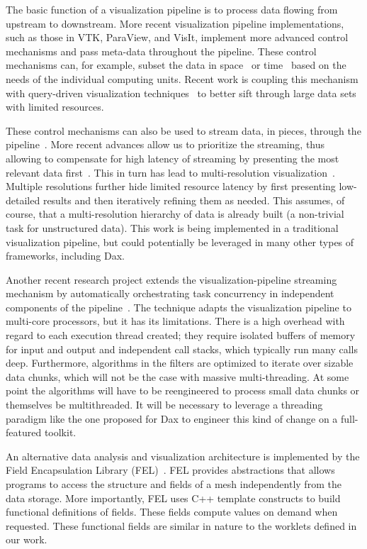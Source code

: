 \documentclass{vgtc}                          %
\newcommand*{\lcite}[1]{~\cite{#1}}
\begin{document}
The basic function of a visualization pipeline is to process data flowing
from upstream to downstream.  More recent visualization pipeline
implementations, such as those in VTK, ParaView, and VisIt, implement more
advanced control mechanisms and pass meta-data throughout the pipeline.
These control mechanisms can, for example, subset the data in
space\lcite{Childs05} or time\lcite{Biddiscombe07} based on the needs of
the individual computing units.  Recent work is coupling this mechanism
with query-driven visualization techniques\lcite{Gosink08} to better sift
through large data sets with limited resources.

These control mechanisms can also be used to stream data, in pieces,
through the pipeline\lcite{Ahrens01}.  More recent advances allow us to
prioritize the streaming, thus allowing to compensate for high latency of
streaming by presenting the most relevant data first\lcite{Ahrens07}.  This
in turn has lead to multi-resolution
visualization\lcite{Pascucci01,Woodring09}.  Multiple resolutions further
hide limited resource latency by first presenting low-detailed results and
then iteratively refining them as needed.  This assumes, of course, that a
multi-resolution hierarchy of data is already built (a non-trivial task for
unstructured data).  This work is being implemented in a traditional
visualization pipeline, but could potentially be leveraged in many other
types of frameworks, including Dax.

Another recent research project extends the visualization-pipeline
streaming mechanism by automatically orchestrating task concurrency in
independent components of the pipeline\lcite{Vo10,VoPhD}.  The technique adapts
the visualization pipeline to multi-core processors, but it has its
limitations.  There is a high overhead with regard to each execution thread
created; they require isolated buffers of memory for input and output and
independent call stacks, which typically run many calls deep.  Furthermore,
algorithms in the filters are optimized to iterate over sizable data
chunks, which will not be the case with massive multi-threading.  At some
point the algorithms will have to be reengineered to process small data
chunks or themselves be multithreaded.  It will be necessary to leverage a
threading paradigm like the one proposed for Dax to engineer this kind of
change on a full-featured toolkit.

An alternative data analysis and visualization architecture is implemented
by the Field Encapsulation Library (FEL)\lcite{FELPaper}.  FEL provides
abstractions that allows programs to access the structure and fields of a
mesh independently from the data storage.  More importantly, FEL uses C++
template constructs to build functional definitions of fields.  These
fields compute values on demand when requested.  These functional fields
are similar in nature to the worklets defined in our work.
\end{document}
